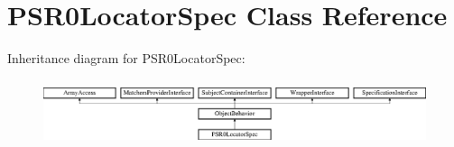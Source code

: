 \section{P\+S\+R0\+Locator\+Spec Class Reference}
\label{classspec_1_1_php_spec_1_1_locator_1_1_p_s_r0_1_1_p_s_r0_locator_spec}
Inheritance diagram for P\+S\+R0\+Locator\+Spec\+:\begin{figure}[H]
\begin{center}
\leavevmode
\includegraphics[height=1.953488cm]{classspec_1_1_php_spec_1_1_locator_1_1_p_s_r0_1_1_p_s_r0_locator_spec}
\end{center}
\end{figure}
